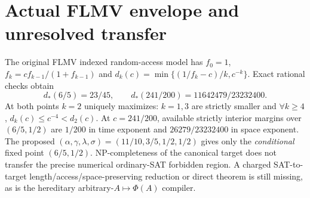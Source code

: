 \documentclass[10pt]{article}
\begin{document}
\section{Actual FLMV envelope and unresolved transfer}
The original FLMV indexed random-access model has $f_0=1$, $f_k=cf_{k-1}/(1+f_{k-1})$ and $d_k(c)=\min\{(1/f_k-c)/k,c^{-k}\}$. Exact rational checks obtain
\[d_*(6/5)=23/45,\qquad d_*(241/200)=11642479/23232400.\]
At both points $k=2$ uniquely maximizes: $k=1,3$ are strictly smaller and $\forall k\ge4$, $d_k(c)\le c^{-4}<d_2(c)$. At $c=241/200$, available strictly interior margins over $(6/5,1/2)$ are $1/200$ in time exponent and $26279/23232400$ in space exponent. The proposed $(\alpha,\gamma,\lambda,\sigma)=(11/10,3/5,1/2,1/2)$ gives only the \emph{conditional} fixed point $(6/5,1/2)$. NP-completeness of the canonical target does not transfer the precise numerical ordinary-SAT forbidden region. A charged SAT-to-target length/access/space-preserving reduction or direct theorem is still missing, as is the hereditary arbitrary-$A\mapsto\Phi(A)$ compiler.
\end{document}
